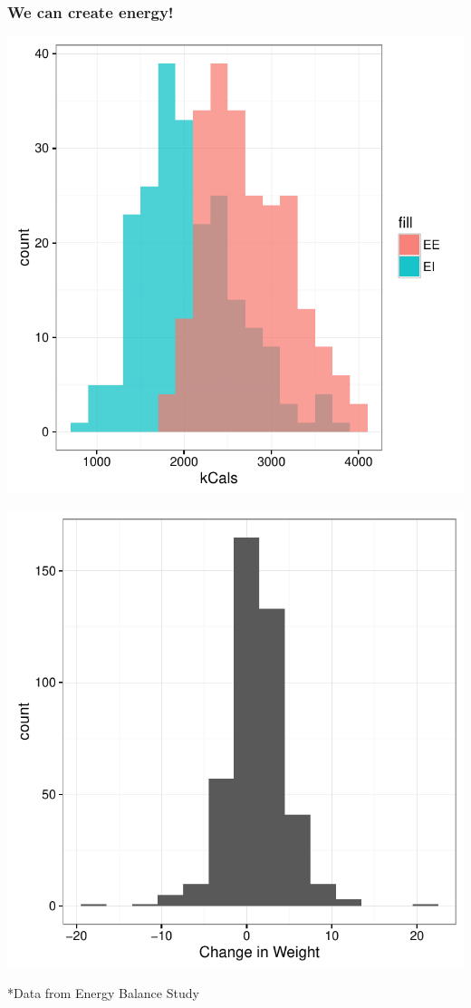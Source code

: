 \documentclass[handout]{beamer}\usepackage[]{graphicx}\usepackage[]{color}
\newenvironment{knitrout}{}{} %
\begin{document}
\begin{frame}
\frametitle{We can create energy!}

\begin{multicols}{2}
\begin{knitrout}\tiny
{}\color{fgcolor}

{\centering \includegraphics[width=.8\linewidth]{figure/eivsee-1} 

}



\end{knitrout}

\columnbreak
\pause
\begin{knitrout}\tiny
{}\color{fgcolor}

{\centering \includegraphics[width=.8\linewidth]{figure/eivsee2-1} 

}



\end{knitrout}

\end{multicols}

*Data from Energy Balance Study

\end{frame}
\end{document}
